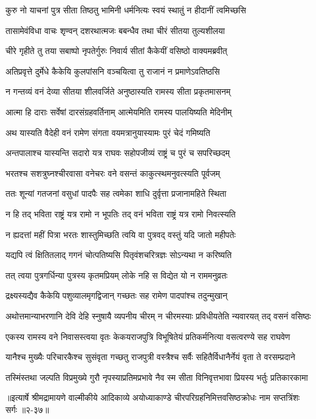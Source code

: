 \twolineshloka
{कुरु नो याचनां पुत्र सीता तिष्ठतु भामिनी}
{धर्मनित्यः स्वयं स्थातुं न हीदानीं त्वमिच्छसि} %

\twolineshloka
{तासामेवंविधा वाचः शृण्वन् दशरथात्मजः}
{बबन्धैव तथा चीरं सीतया तुल्यशीलया} %

\twolineshloka
{चीरे गृहीते तु तया सबाष्पो नृपतेर्गुरुः}
{निवार्य सीतां कैकेयीं वसिष्ठो वाक्यमब्रवीत्} %

\twolineshloka
{अतिप्रवृत्ते दुर्मेधे कैकेयि कुलपांसनि}
{वञ्चयित्वा तु राजानं न प्रमाणेऽवतिष्ठसि} %

\twolineshloka
{न गन्तव्यं वनं देव्या सीतया शीलवर्जिते}
{अनुष्ठास्यति रामस्य सीता प्रकृतमासनम्} %

\twolineshloka
{आत्मा हि दाराः सर्वेषां दारसंग्रहवर्तिनाम्}
{आत्मेयमिति रामस्य पालयिष्यति मेदिनीम्} %

\twolineshloka
{अथ यास्यति वैदेही वनं रामेण संगता}
{वयमत्रानुयास्यामः पुरं चेदं गमिष्यति} %

\twolineshloka
{अन्तपालाश्च यास्यन्ति सदारो यत्र राघवः}
{सहोपजीव्यं राष्ट्रं च पुरं च सपरिच्छदम्} %

\twolineshloka
{भरतश्च सशत्रुघ्नश्चीरवासा वनेचरः}
{वने वसन्तं काकुत्स्थमनुवत्स्यति पूर्वजम्} %

\twolineshloka
{ततः शून्यां गतजनां वसुधां पादपैः सह}
{त्वमेका शाधि दुर्वृत्ता प्रजानामहिते स्थिता} %

\twolineshloka
{न हि तद् भविता राष्ट्रं यत्र रामो न भूपतिः}
{तद् वनं भविता राष्ट्रं यत्र रामो निवत्स्यति} %

\twolineshloka
{न ह्यदत्तां महीं पित्रा भरतः शास्तुमिच्छति}
{त्वयि वा पुत्रवद् वस्तुं यदि जातो महीपतेः} %

\twolineshloka
{यद्यपि त्वं क्षितितलाद् गगनं चोत्पतिष्यसि}
{पितृवंशचरित्रज्ञः सोऽन्यथा न करिष्यति} %

\twolineshloka
{तत् त्वया पुत्रगर्धिन्या पुत्रस्य कृतमप्रियम्}
{लोके नहि स विद्येत यो न राममनुव्रतः} %

\twolineshloka
{द्रक्ष्यस्यद्यैव कैकेयि पशुव्यालमृगद्विजान्}
{गच्छतः सह रामेण पादपांश्च तदुन्मुखान्} %

\twolineshloka
{अथोत्तमान्याभरणानि देवि देहि स्नुषायै व्यपनीय चीरम्}
{न चीरमस्याः प्रविधीयतेति न्यवारयत् तद् वसनं वसिष्ठः} %

\twolineshloka
{एकस्य रामस्य वने निवासस्त्वया वृतः केकयराजपुत्रि}
{विभूषितेयं प्रतिकर्मनित्या वसत्वरण्ये सह राघवेण} %

\twolineshloka
{यानैश्च मुख्यैः परिचारकैश्च सुसंवृता गच्छतु राजपुत्री}
{वस्त्रैश्च सर्वैः सहितैर्विधानैर्नेयं वृता ते वरसम्प्रदाने} %

\twolineshloka
{तस्मिंस्तथा जल्पति विप्रमुख्ये गुरौ नृपस्याप्रतिमप्रभावे}
{नैव स्म सीता विनिवृत्तभावा प्रियस्य भर्तुः प्रतिकारकामा} %


॥इत्यार्षे श्रीमद्रामायणे वाल्मीकीये आदिकाव्ये अयोध्याकाण्डे चीरपरिग्रहनिमित्तवसिष्ठक्रोधः नाम सप्तत्रिंशः सर्गः ॥२-३७॥
